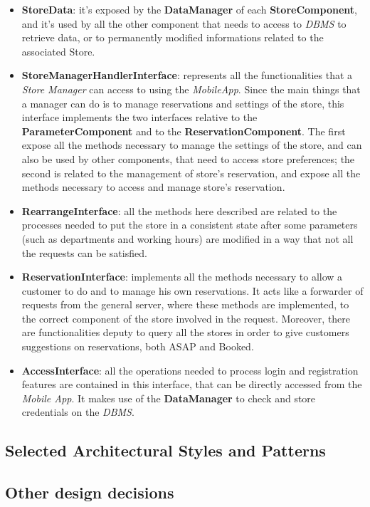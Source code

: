 \documentclass{article}
\begin{document}
	\begin{itemize}
		\item {\bfseries StoreData}: it's exposed by the {\bfseries DataManager} of each {\bfseries StoreComponent}, and it's used by all the other component that needs to access to \emph{DBMS} to retrieve data, or to permanently modified informations related to the associated Store.
		\item {\bfseries StoreManagerHandlerInterface}: represents all the functionalities that a \emph{Store Manager} can access to using the \emph{MobileApp}. Since the main things that a manager can do is to manage reservations and settings of the store, this interface implements the two interfaces relative to the {\bfseries ParameterComponent} and to the {\bfseries ReservationComponent}. The first expose all the methods necessary to manage the settings of the store, and can also be used by other components, that need to access store preferences; the second is related to the management of store's reservation, and expose all the methods necessary to access and manage store's reservation.
		\item{\bfseries RearrangeInterface}: all the methods here described are related to the processes needed to put the store in a consistent state after some parameters (such as departments and working hours) are modified in a way that not all the requests can be satisfied.
		\item{\bfseries ReservationInterface}: implements all the methods necessary to allow a customer to do and to manage his own reservations. It acts like a forwarder of requests from the general server, where these methods are implemented, to the correct component of the store involved in the request. Moreover, there are functionalities deputy to query all the stores in order to give customers suggestions on reservations, both ASAP and Booked.
		\item{\bfseries AccessInterface}: all the operations needed to process login and registration features are contained in this interface, that can be directly accessed from the \emph{Mobile App}. It makes use of the {\bfseries DataManager} to check and store credentials on the \emph{DBMS}.
		
	\end{itemize}
	\subsection{Selected Architectural Styles and Patterns}
	\subsection{Other design decisions}
\end{document}
